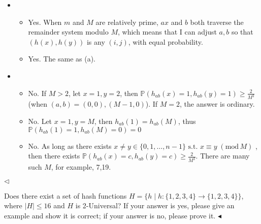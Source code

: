 \documentclass[11pt]{article}
\newenvironment{problem}[2][Problem]{\begin{trivlist}
\item[\hskip \labelsep {\bfseries #1}\hskip \labelsep {\bfseries #2.}]}{\hfill$\blacktriangleleft$\end{trivlist}}
\newenvironment{answer}[1][Answer]{\begin{trivlist}
\item[\hskip \labelsep {\bfseries #1.}\hskip \labelsep]}{\hfill$\lhd$\end{trivlist}}
\begin{document}
\begin{answer}
\begin{itemize}
    \item [(1)] 
    \begin{itemize}
        \item [(a)] Yes. When $m$ and $M$ are relatively prime, $ax$ and $b$ both traverse the remainder system modulo $M$, which means that I can adjust $a,b$ so that $(h(x),h(y))$ is any $(i,j)$, with equal probability.
        \item [(b)] Yes. The same as (a).
    \end{itemize}
    \item [(2)] 
    \begin{itemize}
        \item [(a)] No. If $M>2$, let $x= 1,y=2$, then $\mathbb P(h_{ab}(x) = 1,h_{ab}(y) = 1) \ge \frac{2}{M^2}$ (when $(a,b) = (0,0), (M-1,0)$). If $M = 2$, the answer is ordinary.
        \item [(b)] No. Let $x = 1, y = M$,  then $h_{ab}(1) = h_{ab}(M)$, thus $\mathbb P(h_{ab}(1) = 1,h_{ab}(M) = 0) = 0$
        \item [(c)] No. As long as there exists $x\neq y\in \{0,1,\dots,n-1\}\text{ s.t. } x\equiv y\;(\mathrm{mod}\,M)$ , then there exists $\mathbb P(h_{ab}(x) =c, h_{ab}(y)=c ) \ge \frac{2}{M^2}$. There are many such $M$, for example, 7,19.
    \end{itemize}
\end{itemize}
\end{answer}


\begin{problem}{6 (12')}
Does there exist a set of hash functions $H=\{h\mid h:\{1,2,3,4\}\rightarrow\{1,2,3,4\}\}$, where $|H| \leq 16$ and $H$ is 2-Universal? If your answer is yes, please give an example and show it is correct; if your answer is no, please prove it.
\end{problem}
\end{document}
